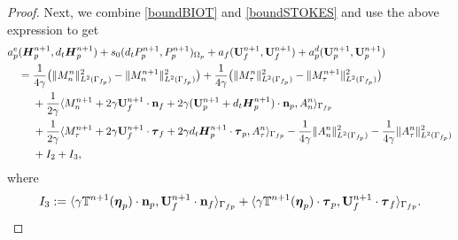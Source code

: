 \documentclass[11pt]{article}
\def\n{{\bf n}}
\def\btau{\boldsymbol{\tau}}
\def\bbeta{\boldsymbol{\eta}}
\def\U{{\bf U}}
\def\E{\boldsymbol{H}}
\def\O{\Omega}
\def\<{\langle}
\def\>{\rangle}
\def\ddt{d_t}
\begin{document}
\begin{proof}
Next, we combine \eqref{boundBIOT} and \eqref{boundSTOKES} and use the above expression to get
%
\begin{alignat*}{1}
  &
  a_p^e(\E_p^{n+1}, \ddt \E_p^{n+1})
  + s_0(\ddt P_p^{n+1}, P_p^{n+1})_{\O_p}
  + a_f(\U_f^{n+1},\U_f^{n+1})
  + a_p^d (\U_p^{n+1}, \U_p^{n+1})
  \\
& \quad
  = \frac{1}{4\gamma}\big(\|M_n^n\|_{L^2(\Gamma_{f_p})}^2 -\|M_n^{n+1}\|_{L^2(\Gamma_{f_p})}^2\big) 
  +\frac{1}{4\gamma}\big(\|M_\tau^n\|_{L^2(\Gamma_{f_p})}^2 -\|M_\tau^{n+1}\|_{L^2(\Gamma_{f_p})}^2\big) \\
& \qquad \
  + \frac{1}{2\gamma} \<M_n^{n+1} + 2\gamma \U_f^{n+1}\cdot \n_f + 2\gamma (\U_p^{n+1} + \ddt \E_p^{n+1})\cdot \n_p, A_n^n\>_{\Gamma_{fp}}\\
  &\qquad \ + \frac{1}{2\gamma}\<M_\tau^{n+1} + 2\gamma \U_f^{n+1} \cdot \btau_f + 2\gamma \ddt \E_p^{n+1} \cdot \btau_p, A_\tau^n\>_{\Gamma_{fp}} - \frac{1}{4\gamma}\|A_n^n\|_{L^2(\Gamma_{f_p})}^2   -\frac{1}{4\gamma} \|A_\tau^n\|_{L^2(\Gamma_{f_p})}^2 \\
& \qquad \  + I_2 + I_3,
\end{alignat*}
where 
\begin{alignat}{1}\label{H4}
I_3:= \<\gamma \mathbb{T}^{n+1}(\bbeta_p)\cdot\n_p, \U_f^{n+1}\cdot \n_f\>_{\Gamma_{fp}}+ \<\gamma \mathbb{T}^{n+1}(\bbeta_p)\cdot \btau_p,\U_f^{n+1}\cdot \btau_f\>_{\Gamma_{fp}}.
\end{alignat}


\end{proof}
\end{document}
